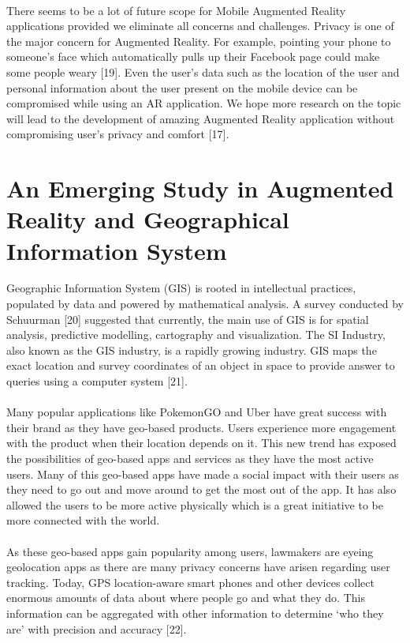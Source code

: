 \paragraph{} 
    There seems to be a lot of future scope for Mobile Augmented Reality applications 
provided we eliminate all concerns and challenges. Privacy is one of the major concern 
for Augmented Reality. For example, pointing your phone to someone’s face which 
automatically pulls up their Facebook page could make some people weary [19]. Even the 
user’s data such as the location of the user and personal information about the user 
present on the mobile device can be compromised while using an AR application. We 
hope more research on the topic will lead to the development of amazing Augmented 
Reality application without compromising user’s privacy and comfort [17]. 
\section{An Emerging Study in Augmented Reality and Geographical Information System}
Geographic Information System (GIS) is rooted in intellectual practices, populated by data and powered by mathematical analysis. A survey conducted by Schuurman [20] suggested that currently, the main use of GIS is for spatial analysis, predictive modelling, cartography and visualization. The SI Industry, also known as the GIS industry, is a rapidly growing industry. GIS maps the exact location and survey coordinates of an object in space to provide answer to queries using a computer system [21].
\paragraph{} Many popular applications like PokemonGO and Uber have great success with their brand as they have geo-based products. Users experience more engagement with the product when their location depends on it. This new trend has exposed the possibilities of geo-based apps and services as they have the most active users. Many of this geo-based apps have made a social impact with their users as they need to go out and move around to get the most out of the app. It has also allowed the users to be more active physically which is a great initiative to be more connected with the world.
\paragraph{} As these geo-based apps gain popularity among users, lawmakers are eyeing geolocation apps as there are many privacy concerns have arisen regarding user tracking. Today, GPS location-aware smart phones and other devices collect enormous amounts of data about where people go and what they do. This information can be aggregated with other information to determine ‘who they are’ with precision and accuracy [22].
